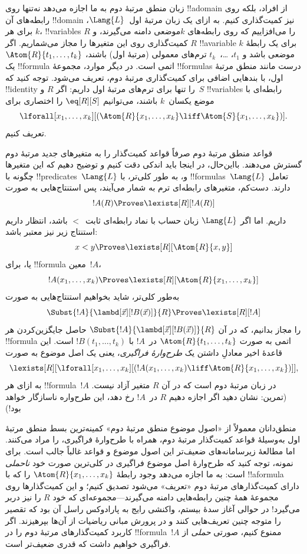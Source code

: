 \documentclass[../../../include/open-logic-section]{subfiles}
\begin{document}


زبان منطق مرتبهٔ دوم به ما اجازه می‌دهد نه‌تنها روی !!a{domain} از
افراد، بلکه روی رابطه‌های آن !!{domain} نیز کمیت‌گذاری کنیم. به ازای
یک زبان مرتبهٔ اول~$\Lang{L}$، برای هر $k$، !!{variable}s $R$ را
می‌افزاییم که روی رابطه‌های $k$موضعی دامنه می‌گیرند، و کمیت‌گذاری روی
این متغیرها را مجاز می‌شماریم. اگر $R$ !!a{variable} برای یک رابطهٔ
$k$موضعی باشد و $t_1$، \dots،~$t_k$ ترم‌های معمولی (مرتبهٔ اول)
باشند، $\Atom{R}{t_1,\dots,t_k}$ یک !!{formula} اتمی است. در دیگر
موارد، مجموعهٔ !!{formula}s درست مانند منطق مرتبهٔ اول، با بندهایی
اضافی برای کمیت‌گذاری مرتبهٔ دوم، تعریف می‌شود. توجه کنید که
!!{identity} را تنها برای ترم‌های مرتبهٔ اول داریم: اگر $R$ و~$S$
!!{variable}s رابطه‌ای با موضع یکسان~$k$ باشند، می‌توانیم
$\eq[R][S]$ را اختصاری برای
\[
\lforall[x_1, \dots, x_k][(\Atom{R}{x_1, \dots, x_k} \liff
  \Atom{S}{x_1, \dots, x_k})].
\]
تعریف کنیم.

قواعد منطق مرتبهٔ دوم صرفاً قواعد کمیت‌گذار را به متغیرهای جدید
مرتبهٔ دوم گسترش می‌دهند. بااین‌حال، در اینجا باید اندکی دقت کنیم و
توضیح دهیم که این متغیرها چگونه با !!{predicate}s~$\Lang{L}$ و، به
طور کلی‌تر، با !!{formula}s~$\Lang{L}$ تعامل دارند. دست‌کم، متغیرهای
رابطه‌ای ترم به شمار می‌آیند، پس استنتاج‌هایی به صورت
\[
!A(R) \Proves \lexists[R][!A(R)]
\]
داریم. اما اگر $\Lang{L}$ زبان حساب با نماد رابطه‌ای ثابت~$<$ باشد،
انتظار داریم استنتاج زیر نیز معتبر باشد:
\[
x < y \Proves \lexists[R][\Atom{R}{x,y}]
\]
یا، برای !!{formula} معین~$!A$،
\[
!A(x_1, \dots, x_k) \Proves \lexists[R][\Atom{R}{x_1,\dots,x_k}]
\]
به‌طور کلی‌تر، شاید بخواهیم استنتاج‌هایی به صورت
\[
\Subst{!A}{\lambd[\vec x][!B(\vec x)]}{R} \Proves
\lexists[R][!A]
\]
را مجاز بدانیم، که در آن
$\Subst{!A}{\lambd[\vec x][!B(\vec x)]}{R}$ حاصل جایگزین‌کردن هر
!!{formula} اتمی به صورت $\Atom{R}{t_1,\dots,t_k}$ در~$!A$ با
$!B(t_1, \dots, t_k)$ است. این قاعدهٔ اخیر معادلِ داشتن یک
{\em طرح‌وارهٔ فراگیری}، یعنی یک اصل موضوع به صورت
\[
\lexists[R][\lforall[x_1, \dots, x_k][(!A(x_1, \dots, x_k) \liff
\Atom{R}{x_1, \dots, x_k})]],
\]
به ازای هر !!{formula}~$!A$ در زبان مرتبهٔ دوم است که در آن $R$ متغیر
آزاد نیست. (تمرین: نشان دهید اگر اجازه دهیم $R$ در~$!A$ رخ دهد، این
طرح‌واره ناسازگار خواهد بود!)

منطق‌دانان معمولاً از «اصول موضوع منطق مرتبهٔ دوم» کمینه‌ترین بسط منطق
مرتبهٔ اول به‌وسیلهٔ قواعد کمیت‌گذار مرتبهٔ دوم، همراه با طرح‌وارهٔ
فراگیری، را مراد می‌کنند. اما مطالعهٔ زیرسامانه‌های ضعیف‌تر این اصول
موضوع و قواعد غالباً جالب است. برای نمونه، توجه کنید که طرح‌وارهٔ اصل
موضوع فراگیری در کلی‌ترین صورت خود \emph{ناحملی} است: به ما اجازه
می‌دهد وجود رابطهٔ $\Atom{R}{x_1, \dots, x_k}$ را که با !!a{formula}
دارای کمیت‌گذارهای مرتبهٔ دوم «تعریف» می‌شود تصدیق کنیم؛ و این
کمیت‌گذارها روی مجموعهٔ همهٔ چنین رابطه‌هایی دامنه می‌گیرند---مجموعه‌ای
که خود $R$ را نیز دربر می‌گیرد!{} در حوالی آغاز سدهٔ بیستم، واکنشی
رایج به پارادوکس راسل آن بود که تقصیر را متوجه چنین تعریف‌هایی کنند و
در پرورش مبانی ریاضیات از آن‌ها بپرهیزند. اگر کاربرد کمیت‌گذارهای
مرتبهٔ دوم را در !!{formula}~$!A$ ممنوع کنیم، صورتی \emph{حملی} از
فراگیری خواهیم داشت که قدری ضعیف‌تر است.
\end{document}
